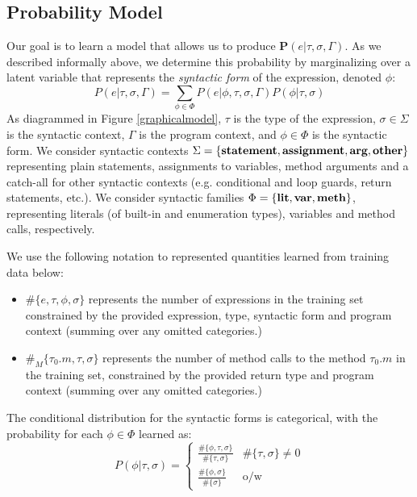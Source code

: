 \documentclass{article} %
\begin{document}
\newcommand{\nm}[1]{\#\{#1\}}
\newcommand{\nmm}[1]{\#_M\{#1\}}

\subsection*{Probability Model}
      Our goal is to learn a model that allows us to produce $\mathbf{P}(e|\tau, \sigma, \Gamma)$. As we described informally above, we determine this probability by marginalizing over a latent variable that represents the \emph{syntactic form} of the expression, denoted $\phi$:
    $$P(e | \tau, \sigma, \Gamma) = \sum_{\phi \in \Phi} P(e | \phi, \tau, \sigma, \Gamma) P(\phi | \tau, \sigma)$$
As diagrammed in Figure \ref{graphicalmodel}, $\tau$ is the type of the expression, $\sigma \in \Sigma$ is the syntactic context, $\Gamma$ is the program context, and $\phi \in \Phi$ is the syntactic form. We consider syntactic contexts $\Sigma = \{\textbf{statement}, \textbf{assignment}, \textbf{arg}, \textbf{other}\}$ representing plain statements, assignments to variables, method arguments and a catch-all for other syntactic contexts (e.g. conditional and loop guards, return statements, etc.). We consider syntactic families $\Phi = \{\textbf{lit}, \textbf{var}, \textbf{meth}\}$, representing literals (of built-in and enumeration types), variables and method calls, respectively. 

	  We use the following notation to represented quantities learned from training data below:
	  \begin{itemize}
	  \item $\nm{e, \tau, \phi, \sigma}$ represents the number of expressions in the training set constrained by the provided expression, type, syntactic form and program context (summing over any omitted categories.)
	  \item $\nmm{\tau_0.m, \tau, \sigma}$ represents the number of method calls to the method $\tau_0.m$ in the training set, constrained by the provided return type and program context (summing over any omitted categories.)
  	  \end{itemize}
  
  The conditional distribution for the syntactic forms is categorical, with the probability for each $\phi \in \Phi$ learned as:
  $$P(\phi | \tau, \sigma) = 
  \left\{
  	\begin{array}{ll}
	 	\frac{\nm{\phi,\tau, \sigma}}{\nm{\tau, \sigma}} & \nm{\tau, \sigma} \neq 0\\
		\frac{\nm{\phi, \sigma}}{\nm{\sigma}} & \mbox{o/w}
	\end{array}
	\right.
  $$
  
\end{document}

